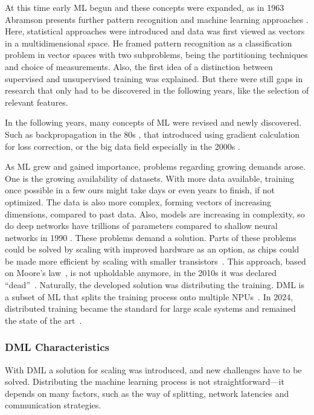 At this time early \ac{ML} begun and these concepts were expanded, as in 1963 Abramson presents further pattern recognition and machine learning approaches \cite{abramson_pattern_1963}. Here, statistical approaches were introduced and data was first viewed as vectors in a multidimensional space. He framed pattern recognition as a classification problem in vector spaces with two subproblems, being the partitioning techniques and choice of measurements. 
Also, the first idea of a distinction between supervised and unsupervised training was explained. But there were still gaps in research that only had to be discovered in the following years, like the selection of relevant features.

In the following years, many concepts of \ac{ML} were revised and newly discovered. Such as backpropagation in the 80s \cite{rojas_backpropagation_1996}, that introduced using gradient calculation for loss correction, or the big data field especially in the 2000s \cite{perez_karich_emergence_2025}. 

As \ac{ML} grew and gained importance, problems regarding growing demands arose. One is the growing availability of datasets. With more data available, training once possible in a few ours might take days or even years to finish, if not optimized. The data is also more complex, forming vectors of increasing dimensions, compared to past data.
Also, models are increasing in complexity, so do deep networks have trillions of parameters compared to shallow neural networks in 1990 \cite{oneto_limitations_2020}.
These problems demand a solution. Parts of these problems could be solved by scaling with improved hardware as an option, as chips could be made more efficient by scaling with smaller transistors~\cite{sevilla_compute_2022}. This approach, based on Moore's law~\cite{moore_cramming_2006}, is not upholdable anymore, in the 2010s it was declared ``dead''~\cite{theis_end_2017}.
Naturally, the developed solution was distributing the training. \ac{DML} is a subset of \ac{ML} that splits the training process onto multiple \acp{NPU}~\cite{bekkerman_scaling_2011}.
In 2024, distributed training became the standard for large scale systems and remained the state of the art~\cite{li_understanding_2024}. 

\subsubsection*{DML Characteristics}
With \ac{DML} a solution for scaling was introduced, and new challenges have to be solved.
Distributing the machine learning process is not straightforward---it depends on many factors, such as the way of splitting, network latencies and communication strategies.

